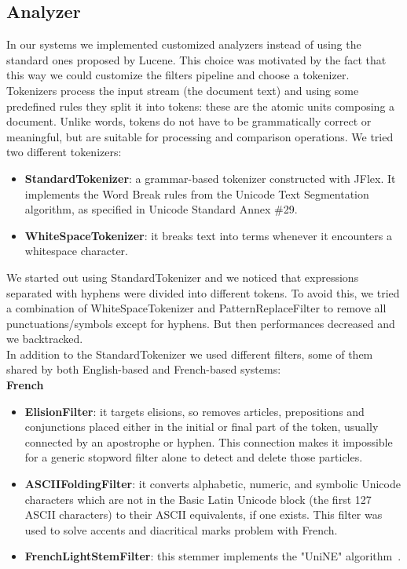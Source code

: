 \subsection{Analyzer}
\label{subsec:analyzer}
In our systems we implemented customized analyzers instead of using the standard ones proposed by Lucene. This choice was motivated by the fact that this way we could customize the filters pipeline and choose a tokenizer. Tokenizers process the input stream (the document text) and using some predefined rules they split it into tokens: these are the atomic units composing a document. Unlike words, tokens do not have to be grammatically correct or meaningful, but are suitable for processing and comparison operations.
We tried two different tokenizers:
\begin{itemize}
    \item \textbf{StandardTokenizer}: a grammar-based tokenizer constructed with JFlex. It implements the Word Break rules from the Unicode Text Segmentation algorithm, as specified in Unicode Standard Annex \#29.
    \item \textbf{WhiteSpaceTokenizer}: it breaks text into terms whenever it encounters a whitespace character.
\end{itemize}
We started out using StandardTokenizer and we noticed that expressions separated with hyphens were divided into different tokens. To avoid this, we tried a combination of WhiteSpaceTokenizer and PatternReplaceFilter to remove all punctuations/symbols except for hyphens. But then performances decreased and we backtracked.
\\
In addition to the StandardTokenizer we used different filters, some of them shared by both English-based and French-based systems:
\\
\textbf{French}
\begin{itemize}
    \item \textbf{ElisionFilter}: it targets elisions, so removes articles, prepositions and conjunctions placed either in the initial or final part of the token, usually connected by an apostrophe or hyphen. This connection makes it impossible for a generic stopword filter alone to detect and delete those particles.
    \item \textbf{ASCIIFoldingFilter}: it converts alphabetic, numeric, and symbolic Unicode characters which are not in the Basic Latin Unicode block (the first 127 ASCII characters) to their ASCII equivalents, if one exists. This filter was used to solve accents and diacritical marks problem with French.
    \item \textbf{FrenchLightStemFilter}: this stemmer implements the "UniNE" algorithm~\cite{frenchlightstemmer}.
\end{itemize}
